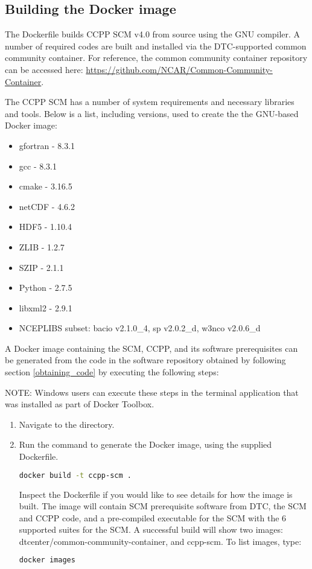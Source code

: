 \subsection{Building the Docker image}

The Dockerfile builds CCPP SCM v4.0 from source using the GNU compiler. A number of required codes are built and installed via the DTC-supported common community container. For reference, the common community container repository can be accessed here: \url{https://github.com/NCAR/Common-Community-Container}.

The CCPP SCM has a number of system requirements and necessary libraries and tools. Below is a list, including versions, used to create the the GNU-based Docker image:
\begin{itemize}
\item gfortran - 8.3.1
\item gcc - 8.3.1
\item cmake - 3.16.5
\item netCDF - 4.6.2
\item HDF5 - 1.10.4
\item ZLIB - 1.2.7
\item SZIP - 2.1.1
\item Python - 2.7.5
\item libxml2 - 2.9.1
\item NCEPLIBS subset: bacio v2.1.0\_4, sp v2.0.2\_d, w3nco v2.0.6\_d
\end{itemize}

A Docker image containing the SCM, CCPP, and its software prerequisites can be generated from the code in the software repository obtained by following section \ref{obtaining_code} by executing the following steps:

NOTE: Windows users can execute these steps in the terminal application that was installed as part of Docker Toolbox.

\begin{enumerate}
\item Navigate to the  directory.
\item Run the  command to generate the Docker image, using the supplied Dockerfile.
\begin{lstlisting}[language=bash]
docker build -t ccpp-scm .
\end{lstlisting}
Inspect the Dockerfile if you would like to see details for how the image is built. The image will contain SCM prerequisite software from DTC, the SCM and CCPP code, and a pre-compiled executable for the SCM with the 6 supported suites for the SCM. A successful build will show two images: dtcenter/common-community-container, and ccpp-scm. To list images, type:
\begin{lstlisting}[language=bash]
docker images
\end{lstlisting}
\end{enumerate}


